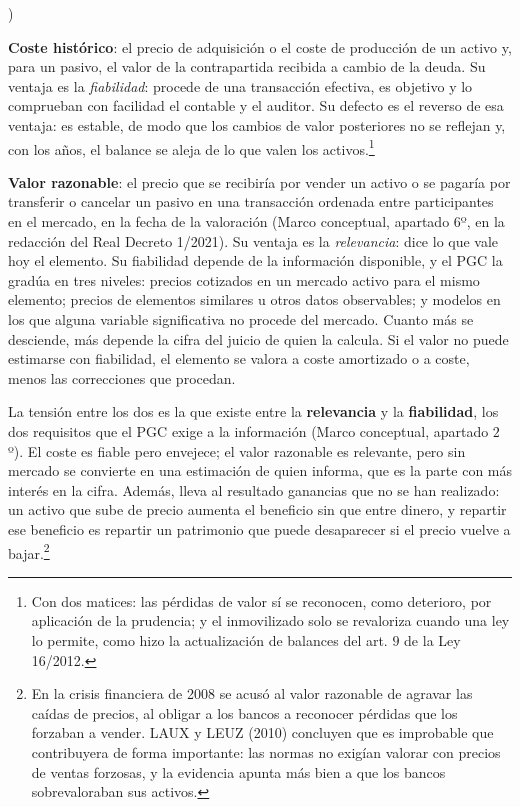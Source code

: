 \documentclass[10pt,a4paper]{article}
\newcounter{alphaitem}
\newenvironment{la}
      {\begin{list}{\alph{alphaitem})}{%
          \usecounter{alphaitem}%
          \setlength{\leftmargin}{1cm}%
          \setlength{\parskip}{3pt}%
          \setlength{\itemsep}{0pt}%
          \setlength{\parsep}{0pt}%
      }}
      {\end{list}}
\begin{document}
\begin{la}
    \item \textbf{Coste histórico}: el precio de adquisición o el coste de producción de un activo y, para un pasivo, el valor de la contrapartida recibida a cambio de la deuda. Su ventaja es la \textit{fiabilidad}: procede de una transacción efectiva, es objetivo y lo comprueban con facilidad el contable y el auditor. Su defecto es el reverso de esa ventaja: es estable, de modo que los cambios de valor posteriores no se reflejan y, con los años, el balance se aleja de lo que valen los activos.\footnote{%
        Con dos matices: las pérdidas de valor sí se reconocen, como deterioro, por aplicación de la prudencia; y el inmovilizado solo se revaloriza cuando una ley lo permite, como hizo la actualización de balances del art. $9$ de la Ley 16/2012.
    }
    \item \textbf{Valor razonable}: el precio que se recibiría por vender un activo o se pagaría por transferir o cancelar un pasivo en una transacción ordenada entre participantes en el mercado, en la fecha de la valoración (Marco conceptual, apartado $6$º, en la redacción del Real Decreto 1/2021). Su ventaja es la \textit{relevancia}: dice lo que vale hoy el elemento. Su fiabilidad depende de la información disponible, y el PGC la gradúa en tres niveles: precios cotizados en un mercado activo para el mismo elemento; precios de elementos similares u otros datos observables; y modelos en los que alguna variable significativa no procede del mercado. Cuanto más se desciende, más depende la cifra del juicio de quien la calcula. Si el valor no puede estimarse con fiabilidad, el elemento se valora a coste amortizado o a coste, menos las correcciones que procedan.
\end{la}

La tensión entre los dos es la que existe entre la \textbf{relevancia} y la \textbf{fiabilidad}, los dos requisitos que el PGC exige a la información (Marco conceptual, apartado $2$º). El coste es fiable pero envejece; el valor razonable es relevante, pero sin mercado se convierte en una estimación de quien informa, que es la parte con más interés en la cifra. Además, lleva al resultado ganancias que no se han realizado: un activo que sube de precio aumenta el beneficio sin que entre dinero, y repartir ese beneficio es repartir un patrimonio que puede desaparecer si el precio vuelve a bajar.\footnote{%
  En la crisis financiera de 2008 se acusó al valor razonable de agravar las caídas de precios, al obligar a los bancos a reconocer pérdidas que los forzaban a vender. LAUX y LEUZ (2010) concluyen que es improbable que contribuyera de forma importante: las normas no exigían valorar con precios de ventas forzosas, y la evidencia apunta más bien a que los bancos sobrevaloraban sus activos.
}
\end{document}
